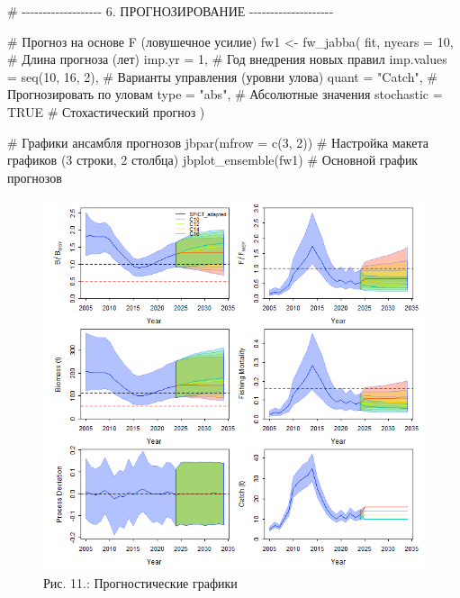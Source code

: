 \documentclass[
  letterpaper,
  DIV=11,
  numbers=noendperiod]{scrreprt}
\newenvironment{Shaded}{\begin{snugshade}}{\end{snugshade}}
\newcommand{\AttributeTok}[1]{\textcolor[rgb]{0.40,0.45,0.13}{#1}}
\newcommand{\CommentTok}[1]{\textcolor[rgb]{0.37,0.37,0.37}{#1}}
\newcommand{\ConstantTok}[1]{\textcolor[rgb]{0.56,0.35,0.01}{#1}}
\newcommand{\DecValTok}[1]{\textcolor[rgb]{0.68,0.00,0.00}{#1}}
\newcommand{\FunctionTok}[1]{\textcolor[rgb]{0.28,0.35,0.67}{#1}}
\newcommand{\NormalTok}[1]{\textcolor[rgb]{0.00,0.23,0.31}{#1}}
\newcommand{\OtherTok}[1]{\textcolor[rgb]{0.00,0.23,0.31}{#1}}
\newcommand{\StringTok}[1]{\textcolor[rgb]{0.13,0.47,0.30}{#1}}
\begin{document}
\begin{Shaded}
\begin{Highlighting}[]
\CommentTok{\# {-}{-}{-}{-}{-}{-}{-}{-}{-}{-}{-}{-}{-}{-}{-}{-}{-}{-}{-} 6. ПРОГНОЗИРОВАНИЕ {-}{-}{-}{-}{-}{-}{-}{-}{-}{-}{-}{-}{-}{-}{-}{-}{-}{-}{-}{-}}

\CommentTok{\# Прогноз на основе F (ловушечное усилие)}
\NormalTok{fw1 }\OtherTok{\textless{}{-}} \FunctionTok{fw\_jabba}\NormalTok{(}
\NormalTok{  fit,}
  \AttributeTok{nyears =} \DecValTok{10}\NormalTok{,       }\CommentTok{\# Длина прогноза (лет)}
  \AttributeTok{imp.yr =} \DecValTok{1}\NormalTok{,        }\CommentTok{\# Год внедрения новых правил}
  \AttributeTok{imp.values =} \FunctionTok{seq}\NormalTok{(}\DecValTok{10}\NormalTok{, }\DecValTok{16}\NormalTok{, }\DecValTok{2}\NormalTok{), }\CommentTok{\# Варианты управления (уровни улова)}
  \AttributeTok{quant =} \StringTok{"Catch"}\NormalTok{,   }\CommentTok{\# Прогнозировать по уловам}
  \AttributeTok{type =} \StringTok{"abs"}\NormalTok{,      }\CommentTok{\# Абсолютные значения}
  \AttributeTok{stochastic =} \ConstantTok{TRUE}  \CommentTok{\# Стохастический прогноз}
\NormalTok{)}

\CommentTok{\# Графики ансамбля прогнозов}
\FunctionTok{jbpar}\NormalTok{(}\AttributeTok{mfrow =} \FunctionTok{c}\NormalTok{(}\DecValTok{3}\NormalTok{, }\DecValTok{2}\NormalTok{)) }\CommentTok{\# Настройка макета графиков (3 строки, 2 столбца)}
\FunctionTok{jbplot\_ensemble}\NormalTok{(fw1)    }\CommentTok{\# Основной график прогнозов}
\end{Highlighting}
\end{Shaded}

\begin{figure}[H]

{\centering \includegraphics[width=0.8\linewidth,height=\textheight,keepaspectratio]{images/JABBA11.png}

}

\caption{Рис. 11.: Прогностические графики}

\end{figure}%
\end{document}
